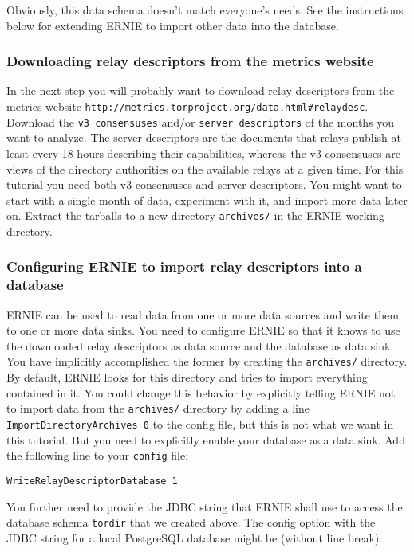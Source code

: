\documentclass{article}
\begin{document}
Obviously, this data schema doesn't match everyone's needs.
See the instructions below for extending ERNIE to import other data into
the database.

\subsubsection{Downloading relay descriptors from the metrics website}

In the next step you will probably want to download relay descriptors from
the metrics website
\verb+http://metrics.torproject.org/data.html#relaydesc+.
Download the \verb+v3 consensuses+ and/or \verb+server descriptors+ of the
months you want to analyze.
The server descriptors are the documents that relays publish at least
every 18 hours describing their capabilities, whereas the v3 consensuses
are views of the directory authorities on the available relays at a given
time.
For this tutorial you need both v3 consensuses and server descriptors.
You might want to start with a single month of data, experiment with it,
and import more data later on.
Extract the tarballs to a new directory \verb+archives/+ in the ERNIE
working directory.

\subsubsection{Configuring ERNIE to import relay descriptors into a
database}

ERNIE can be used to read data from one or more data sources and write
them to one or more data sinks.
You need to configure ERNIE so that it knows to use the downloaded relay
descriptors as data source and the database as data sink.
You have implicitly accomplished the former by creating the
\verb+archives/+ directory.
By default, ERNIE looks for this directory and tries to import everything
contained in it.
You could change this behavior by explicitly telling ERNIE not to import
data from the \verb+archives/+ directory by adding a line
\verb+ImportDirectoryArchives 0+ to the config file, but this is not what
we want in this tutorial.
But you need to explicitly enable your database as a data sink.
Add the following line to your \verb+config+ file:

\begin{verbatim}
WriteRelayDescriptorDatabase 1
\end{verbatim}

You further need to provide the JDBC string that ERNIE shall use to access
the database schema \verb+tordir+ that we created above.
The config option with the JDBC string for a local PostgreSQL database
might be (without line break):
\end{document}
